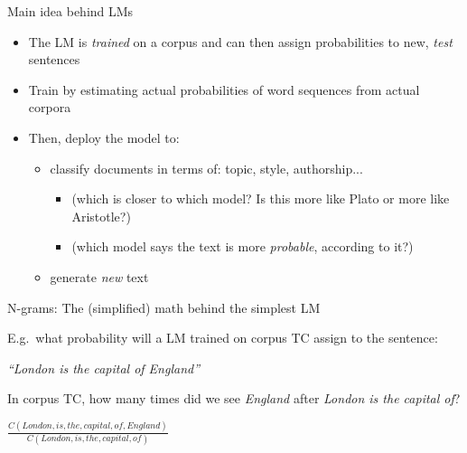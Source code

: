 \documentclass{beamer}
\begin{document}
\begin{frame}{Main idea behind LMs}
  \begin{itemize}
  \item The LM is {\it trained} on a corpus and can then assign probabilities to new, {\it test} sentences
  \item Train by estimating actual probabilities of word sequences from actual corpora
  \item Then, deploy the model to:
    \begin{itemize}
    \item classify documents in terms of: topic, style, authorship... 
      \begin{itemize}
      \item (which is closer to which model? Is this more like Plato or more like Aristotle?)
      \item (which model says the text is more {\it probable}, according to it?)
      \end{itemize}    	
    \item generate {\it new} text
    \end{itemize}	
  \end{itemize}
\end{frame}

\begin{frame}{N-grams: The (simplified) math behind the simplest LM}

  E.g.\ what probability will a LM trained on corpus TC assign to the
  sentence:

  \vspace{0.2cm}

  {\it ``London is the capital of England''}

  In corpus TC, how many times did we see {\it England} after {\it
    London is the capital of}?

  \vspace{0.2cm}

  $\frac{C(London,is,the,capital,of,England)}{C(London,is,the,capital,of)}$

\end{frame}

\end{document}
